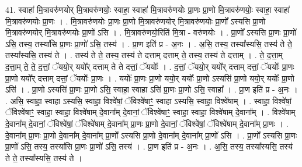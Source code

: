 \documentclass[17pt]{extarticle}
\begin{document}
41. स्वाहा॑ मि॒त्रावरु॑णयोर् मि॒त्रावरु॑णयोः॒ स्वाहा॒ स्वाहा॑ मि॒त्रावरु॑णयोः प्रा॒णः प्रा॒णो मि॒त्रावरु॑णयोः॒ स्वाहा॒ स्वाहा॑ मि॒त्रावरु॑णयोः प्रा॒णः । . मि॒त्रावरु॑णयोः प्रा॒णः प्रा॒णो मि॒त्रावरु॑णयोर् मि॒त्रावरु॑णयोः प्रा॒णो᳚ ऽस्यसि प्रा॒णो मि॒त्रावरु॑णयोर् मि॒त्रावरु॑णयोः प्रा॒णो॑ ऽसि । . मि॒त्रावरु॑णयो॒रिति॑ मि॒त्रा - वरु॑णयोः । . प्रा॒णो᳚ ऽस्यसि प्रा॒णः प्रा॒णो॑ ऽसि॒ तस्य॒ तस्या॑सि प्रा॒णः प्रा॒णो॑ ऽसि॒ तस्य॑ । . प्रा॒ण इति॑ प्र - अ॒नः । . अ॒सि॒ तस्य॒ तस्या᳚स्यसि॒ तस्य॑ ते ते॒ तस्या᳚स्यसि॒ तस्य॑ ते । . तस्य॑ ते ते॒ तस्य॒ तस्य॑ ते दत्ताम् दत्ताम् ते॒ तस्य॒ तस्य॑ ते दत्ताम् । . ते॒ द॒त्ता॒म् द॒त्ता॒म् ते॒ ते॒ द॒त्तां॒ ॅययो॒र् ययो᳚र् दत्ताम् ते ते दत्तां॒ ॅययोः᳚ । . द॒त्तां॒ ॅययो॒र् ययो᳚र् दत्ताम् दत्तां॒ ॅययोः᳚ प्रा॒णः प्रा॒णो ययो᳚र् दत्ताम् दत्तां॒ ॅययोः᳚ प्रा॒णः । . ययोः᳚ प्रा॒णः प्रा॒णो ययो॒र् ययोः᳚ प्रा॒णो ऽस्यसि॑ प्रा॒णो ययो॒र् ययोः᳚ प्रा॒णो ऽसि॑ । . प्रा॒णो ऽस्यसि॑ प्रा॒णः प्रा॒णो ऽसि॒ स्वाहा॒ स्वाहा ऽसि॑ प्रा॒णः प्रा॒णो ऽसि॒ स्वाहा᳚ । . प्रा॒ण इति॑ प्र - अ॒नः । . असि॒ स्वाहा॒ स्वाहा ऽस्यसि॒ स्वाहा॒ विश्वे॑षां॒ ॅविश्वे॑षाꣳ॒॒ स्वाहा ऽस्यसि॒ स्वाहा॒ विश्वे॑षाम् । . स्वाहा॒ विश्वे॑षां॒ ॅविश्वे॑षाꣳ॒॒ स्वाहा॒ स्वाहा॒ विश्वे॑षाम् दे॒वाना᳚म् दे॒वानां॒ ॅविश्वे॑षाꣳ॒॒ स्वाहा॒ स्वाहा॒ विश्वे॑षाम् दे॒वाना᳚म् । . विश्वे॑षाम् दे॒वाना᳚म् दे॒वानां॒ ॅविश्वे॑षां॒ ॅविश्वे॑षाम् दे॒वाना᳚म् प्रा॒णः प्रा॒णो दे॒वानां॒ ॅविश्वे॑षां॒ ॅविश्वे॑षाम् दे॒वाना᳚म् प्रा॒णः । . दे॒वाना᳚म् प्रा॒णः प्रा॒णो दे॒वाना᳚म् दे॒वाना᳚म् प्रा॒णो᳚ ऽस्यसि प्रा॒णो दे॒वाना᳚म् दे॒वाना᳚म् प्रा॒णो॑ ऽसि । . प्रा॒णो᳚ ऽस्यसि प्रा॒णः प्रा॒णो॑ ऽसि॒ तस्य॒ तस्या॑सि प्रा॒णः प्रा॒णो॑ ऽसि॒ तस्य॑ । . प्रा॒ण इति॑ प्र - अ॒नः । . अ॒सि॒ तस्य॒ तस्या᳚स्यसि॒ तस्य॑ ते ते॒ तस्या᳚स्यसि॒ तस्य॑ ते । \newline
\pagebreak
{}
\end{document}
